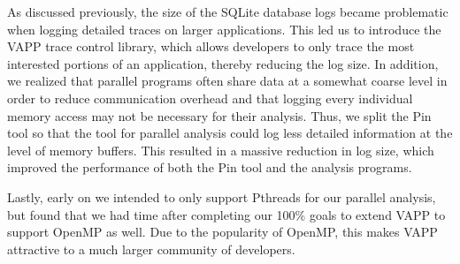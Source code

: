 As discussed previously, the size of the SQLite database logs became
problematic when logging detailed traces on larger applications.  This
led us to introduce the VAPP trace control library, which allows
developers to only trace the most interested portions of an
application, thereby reducing the log size.  In addition, we realized
that parallel programs often share data at a somewhat coarse level in
order to reduce communication overhead and that logging every
individual memory access may not be necessary for their analysis.
Thus, we split the Pin tool so that the tool for parallel analysis
could log less detailed information at the level of memory buffers.
This resulted in a massive reduction in log size, which improved the
performance of both the Pin tool and the analysis programs.

Lastly, early on we intended to only support Pthreads for our parallel
analysis, but found that we had time after completing our 100\% goals
to extend VAPP to support OpenMP as well. Due to the popularity of
OpenMP, this makes VAPP attractive to a much larger community of
developers. 


